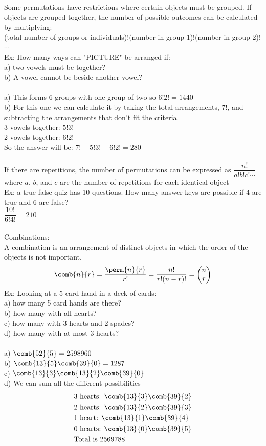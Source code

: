 Some permutations have restrictions where certain objects must be grouped. If objects are grouped together, the number of possible outcomes can be calculated by multiplying:\\
(total number of groups or individuals)!(number in group 1)!(number in group 2)!$\cdots$\\
Ex: How many ways can "PICTURE" be arranged if:\\
a) two vowels must be together?\\
b) A vowel cannot be beside another vowel?\\
\\
a) This forms 6 groups with one group of two so $6!2!=1440$\\
b) For this one we can calculate it by taking the total arrangements, $7!$, and subtracting the arrangements that don't fit the criteria.\\
3 vowels together: $5!3!$\\
2 vowels together: $6!2!$\\
So the answer will be: $7!-5!3!-6!2!=280$\\
\\
If there are repetitions, the number of permutations can be expressed as $\dfrac{n!}{a!b!c!\cdots}$ where $a$, $b$, and $c$ are the number of repetitions for each identical object\\
Ex: a true-false quiz has 10 questions. How many answer keys are possible if 4 are true and 6 are false?\\
$\dfrac{10!}{6!4!}=210$\\
\\
Combinations:\\
A combination is an arrangement of distinct objects in which the order of the objects is not important.
$$\comb{n}{r}=\frac{\perm{n}{r}}{r!}=\frac{n!}{r!(n-r)!}=\left(\begin{matrix} n\\r\end{matrix}\right)$$
Ex: Looking at a 5-card hand in a deck of cards:\\
a) how many 5 card hands are there?\\
b) how many with all hearts?\\
c) how many with 3 hearts and 2 spades?\\
d) how many with at most 3 hearts?\\
\\
a) $\comb{52}{5}=2598960$\\
b) $\comb{13}{5}\comb{39}{0}=1287$\\
c) $\comb{13}{3}\comb{13}{2}\comb{39}{0}$\\
d) We can sum all the different possibilities
\begin{align*}
    &\text{3 hearts: }\comb{13}{3}\comb{39}{2}\\
    &\text{2 hearts: } \comb{13}{2}\comb{39}{3}\\
    &\text{1 heart: }\comb{13}{1}\comb{39}{4}\\
    &\text{0 hearts: }\comb{13}{0}\comb{39}{5}\\
    &\text{Total is }2569788
\end{align*}

